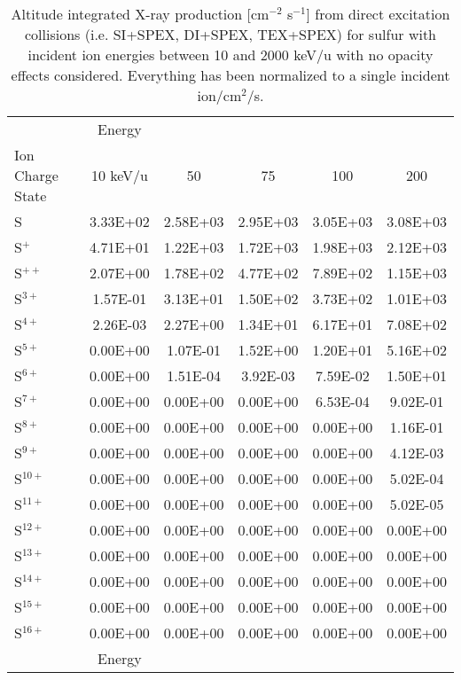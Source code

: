 \begin{table}[ht]
    \centering
    \caption{Altitude integrated X-ray production [cm$^{-2}$ s$^{-1}$] from direct excitation collisions (i.e. SI+SPEX, DI+SPEX, TEX+SPEX) for sulfur with incident ion energies between 10 and 2000 keV/u with no opacity effects considered. Everything has been normalized to a single incident ion/cm$^2$/s.}
    \begin{tabular}{l|c|c|c|c|c}
    \hline
    & Energy & & & & \\
    Ion Charge State & 10 keV/u & 50 & 75 & 100 & 200 \\
    \hline
    S         & 3.33E+02 & 2.58E+03 & 2.95E+03 & 3.05E+03 & 3.08E+03 \\
    S$^+$     & 4.71E+01 & 1.22E+03 & 1.72E+03 & 1.98E+03 & 2.12E+03 \\
    S$^{ ++}$ & 2.07E+00 & 1.78E+02 & 4.77E+02 & 7.89E+02 & 1.15E+03 \\
    S$^{ 3+}$ & 1.57E-01 & 3.13E+01 & 1.50E+02 & 3.73E+02 & 1.01E+03 \\
    S$^{ 4+}$ & 2.26E-03 & 2.27E+00 & 1.34E+01 & 6.17E+01 & 7.08E+02 \\
    S$^{ 5+}$ & 0.00E+00 & 1.07E-01 & 1.52E+00 & 1.20E+01 & 5.16E+02 \\
    S$^{ 6+}$ & 0.00E+00 & 1.51E-04 & 3.92E-03 & 7.59E-02 & 1.50E+01 \\
    S$^{ 7+}$ & 0.00E+00 & 0.00E+00 & 0.00E+00 & 6.53E-04 & 9.02E-01 \\
    S$^{ 8+}$ & 0.00E+00 & 0.00E+00 & 0.00E+00 & 0.00E+00 & 1.16E-01 \\
    S$^{ 9+}$ & 0.00E+00 & 0.00E+00 & 0.00E+00 & 0.00E+00 & 4.12E-03 \\
    S$^{10+}$ & 0.00E+00 & 0.00E+00 & 0.00E+00 & 0.00E+00 & 5.02E-04 \\
    S$^{11+}$ & 0.00E+00 & 0.00E+00 & 0.00E+00 & 0.00E+00 & 5.02E-05 \\
    S$^{12+}$ & 0.00E+00 & 0.00E+00 & 0.00E+00 & 0.00E+00 & 0.00E+00 \\
    S$^{13+}$ & 0.00E+00 & 0.00E+00 & 0.00E+00 & 0.00E+00 & 0.00E+00 \\
    S$^{14+}$ & 0.00E+00 & 0.00E+00 & 0.00E+00 & 0.00E+00 & 0.00E+00 \\
    S$^{15+}$ & 0.00E+00 & 0.00E+00 & 0.00E+00 & 0.00E+00 & 0.00E+00 \\
    S$^{16+}$ & 0.00E+00 & 0.00E+00 & 0.00E+00 & 0.00E+00 & 0.00E+00 \\
    \hline
    \hline
    & Energy & & & & \\

\end{tabular}
\end{table}
